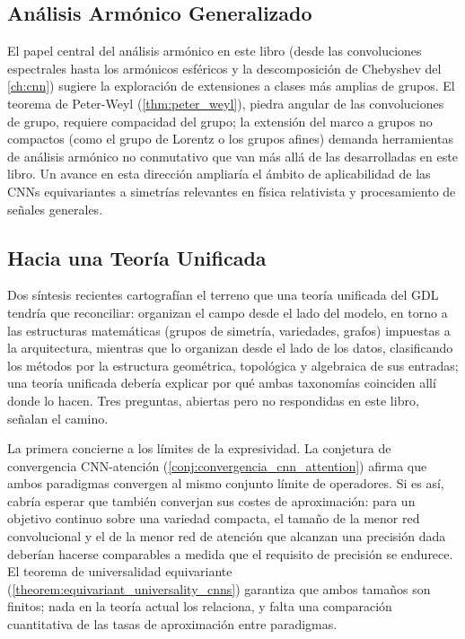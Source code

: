 \subsection{Análisis Armónico Generalizado}

El papel central del análisis armónico en este libro (desde las convoluciones espectrales hasta los armónicos esféricos y la descomposición de Chebyshev del \autoref{ch:cnn}) sugiere la exploración de extensiones a clases más amplias de grupos. El teorema de Peter-Weyl (\autoref{thm:peter_weyl}), piedra angular de las convoluciones de grupo, requiere compacidad del grupo; la extensión del marco a grupos no compactos (como el grupo de Lorentz o los grupos afines) demanda herramientas de análisis armónico no conmutativo que van más allá de las desarrolladas en este libro. Un avance en esta dirección ampliaría el ámbito de aplicabilidad de las \glspl{CNN} equivariantes a simetrías relevantes en física relativista y procesamiento de señales generales.


\subsection{Hacia una Teoría Unificada}\label{subsec:hacia_teoria_unificada}

Dos síntesis recientes cartografían el terreno que una teoría unificada del \gls{GDL} tendría que reconciliar: \citet{saezdeocarizborde2025mathfoundations} organizan el campo desde el lado del modelo, en torno a las estructuras matemáticas (grupos de simetría, variedades, grafos) impuestas a la arquitectura, mientras que \citet{papillon2024beyondeuclid} lo organizan desde el lado de los datos, clasificando los métodos por la estructura geométrica, topológica y algebraica de sus entradas; una teoría unificada debería explicar por qué ambas taxonomías coinciden allí donde lo hacen. Tres preguntas, abiertas pero no respondidas en este libro, señalan el camino.

La primera concierne a los límites de la expresividad. La conjetura de convergencia \gls{CNN}-atención (\autoref{conj:convergencia_cnn_attention}) afirma que ambos paradigmas convergen al mismo conjunto límite de operadores. Si es así, cabría esperar que también converjan sus costes de aproximación: para un objetivo continuo sobre una variedad compacta, el tamaño de la menor red convolucional y el de la menor red de atención que alcanzan una precisión dada deberían hacerse comparables a medida que el requisito de precisión se endurece. El teorema de universalidad equivariante (\autoref{theorem:equivariant_universality_cnns}) garantiza que ambos tamaños son finitos; nada en la teoría actual los relaciona, y falta una comparación cuantitativa de las tasas de aproximación entre paradigmas.

